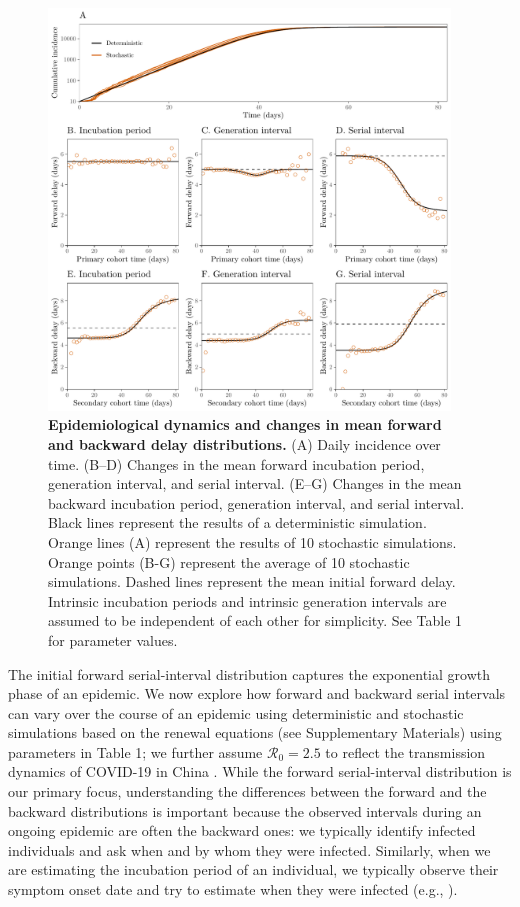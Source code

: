 \documentclass[12pt]{article}
\newcommand{\Rx}[1]{\ensuremath{{\mathcal R}_{#1}}\xspace}
\newcommand{\Ro}{\Rx{0}}
\begin{document}
\begin{figure}[!ht]
\begin{center}
\includegraphics[width=0.95\textwidth]{forward.pdf}
\caption{
\textbf{Epidemiological dynamics and changes in mean forward and backward delay distributions.}
(A) Daily incidence over time.
(B--D) Changes in the mean forward incubation period, generation interval, and serial interval.
(E--G) Changes in the mean backward incubation period, generation interval, and serial interval.
Black lines represent the results of a deterministic simulation.
Orange lines (A) represent the results of 10 stochastic simulations.
Orange points (B-G) represent the average of 10 stochastic simulations.
Dashed lines represent the mean initial forward delay.
Intrinsic incubation periods and intrinsic generation intervals are assumed to be independent of each other for simplicity.
See Table 1 for parameter values.
}
\label{fig:epi}
\end{center}
\end{figure}

The initial forward serial-interval distribution captures the exponential growth phase of an epidemic.
We now explore how forward and backward serial intervals can vary over the course of an epidemic using deterministic and stochastic simulations based on the renewal equations (see Supplementary Materials) using parameters in Table 1;
we further assume $\Ro=2.5$ to reflect the transmission dynamics of COVID-19 in China \citep{doi:10.1098/rsif.2020.0144}.
While the forward serial-interval distribution is our primary focus, understanding the differences between the forward and the backward distributions is important because the observed intervals during an ongoing epidemic are often the backward ones:
we typically identify infected individuals and ask when and by whom they were infected.
Similarly, when we are estimating the incubation period of an individual, we typically observe their symptom onset date and try to estimate when they were infected (e.g., \cite{backer2020incubation}).
\end{document}
